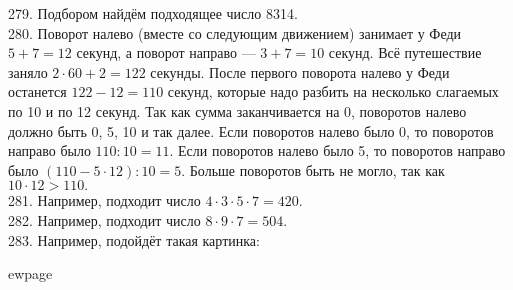 279. Подбором найдём подходящее число 8314.\\
280. Поворот налево (вместе со следующим движением) занимает у Феди $5+7=12$ секунд, а поворот направо --- $3+7=10$ секунд. Всё путешествие заняло $2\cdot60+2=122$ секунды. После первого поворота налево у Феди останется $122-12=110$ секунд, которые надо разбить на несколько слагаемых по 10 и по 12 секунд. Так как сумма заканчивается на 0, поворотов налево должно быть 0, 5, 10 и так далее. Если поворотов налево было 0, то поворотов направо было $110:10=11.$ Если поворотов налево было 5, то поворотов направо было $(110-5\cdot12):10=5.$ Больше поворотов быть не могло, так как $10\cdot12>110.$\\
281. Например, подходит число $4\cdot3\cdot5\cdot7=420.$\\
282. Например, подходит число $8\cdot9\cdot7=504.$\\
283. Например, подойдёт такая картинка:
\begin{center}
\begin{figure}[ht!]
\end{figure}
\end{center}
ewpage

